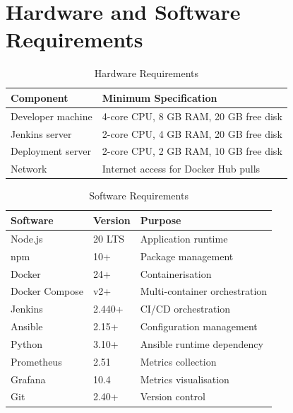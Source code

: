 \documentclass[12pt,a4paper]{report}
\begin{document}
\section{Hardware and Software Requirements}

\begin{table}[H]
\centering
\caption{Hardware Requirements}
\label{tab:hw_req}
\begin{tabularx}{\textwidth}{@{}lX@{}}
\toprule
\textbf{Component} & \textbf{Minimum Specification} \\
\midrule
Developer machine & 4-core CPU, 8 GB RAM, 20 GB free disk \\
Jenkins server    & 2-core CPU, 4 GB RAM, 20 GB free disk \\
Deployment server & 2-core CPU, 2 GB RAM, 10 GB free disk \\
Network           & Internet access for Docker Hub pulls \\
\bottomrule
\end{tabularx}
\end{table}

\begin{table}[H]
\centering
\caption{Software Requirements}
\label{tab:sw_req}
\begin{tabularx}{\textwidth}{@{}llX@{}}
\toprule
\textbf{Software} & \textbf{Version} & \textbf{Purpose} \\
\midrule
Node.js           & 20 LTS        & Application runtime \\
npm               & 10+           & Package management \\
Docker            & 24+           & Containerisation \\
Docker Compose    & v2+           & Multi-container orchestration \\
Jenkins           & 2.440+        & CI/CD orchestration \\
Ansible           & 2.15+         & Configuration management \\
Python            & 3.10+         & Ansible runtime dependency \\
Prometheus        & 2.51          & Metrics collection \\
Grafana           & 10.4          & Metrics visualisation \\
Git               & 2.40+         & Version control \\
\bottomrule
\end{tabularx}
\end{table}
\end{document}
